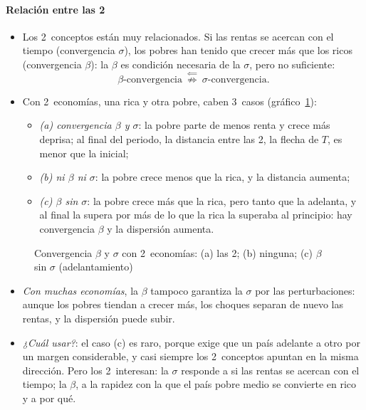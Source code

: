 \documentclass[11pt]{article}
\begin{document}
\paragraph{Relación entre las 2}

\begin{itemize}
\item Los 2~conceptos están muy relacionados. Si las rentas se acercan con el tiempo (convergencia $\sigma$), los pobres han tenido que crecer más que los ricos (convergencia $\beta$): la $\beta$ es condición necesaria de la $\sigma$, pero no suficiente:
  \[
  \beta\text{-convergencia}\ \overset{\Leftarrow}{\not\Rightarrow}\ \sigma\text{-convergencia}.
  \]
\item Con 2~economías, una rica y otra pobre, caben 3~casos (gráfico~\ref{fig:beta-sigma}):
  \begin{itemize}
  \item \emph{(a) convergencia $\beta$ y $\sigma$}: la pobre parte de menos renta y crece más deprisa; al final del periodo, la distancia entre las 2, la flecha de $T$, es menor que la inicial;
  \item \emph{(b) ni $\beta$ ni $\sigma$}: la pobre crece menos que la rica, y la distancia aumenta;
  \item \emph{(c) $\beta$ sin $\sigma$}: la pobre crece más que la rica, pero tanto que la adelanta, y al final la supera por más de lo que la rica la superaba al principio: hay convergencia $\beta$ y la dispersión aumenta.
  \end{itemize}
\end{itemize}

\begin{figure}[H]
\centering
\caption{Convergencia $\beta$ y $\sigma$ con 2~economías: (a) las 2; (b) ninguna; (c) $\beta$ sin $\sigma$ (adelantamiento)}\label{fig:beta-sigma}
\end{figure}

\begin{itemize}
\item \emph{Con muchas economías}, la $\beta$ tampoco garantiza la $\sigma$ por las perturbaciones: aunque los pobres tiendan a crecer más, los choques separan de nuevo las rentas, y la dispersión puede subir\nocite{SalaiMartin1996}.
\item \emph{¿Cuál usar?}: el caso (c) es raro, porque exige que un país adelante a otro por un margen considerable, y casi siempre los 2~conceptos apuntan en la misma dirección. Pero los 2~interesan: la $\sigma$ responde a si las rentas se acercan con el tiempo; la $\beta$, a la rapidez con la que el país pobre medio se convierte en rico y a por qué.
\end{itemize}
\end{document}
